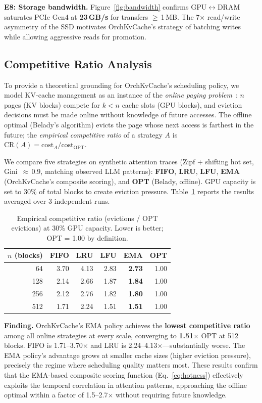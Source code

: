 \documentclass[conference]{IEEEtran}
\begin{document}
\textbf{E8: Storage bandwidth.} Figure~\ref{fig:bandwidth} confirms GPU$\leftrightarrow$DRAM saturates PCIe Gen4 at \textbf{23\,GB/s} for transfers $\geq$\,1\,MB. The 7$\times$ read/write asymmetry of the SSD motivates OrchKvCache's strategy of batching writes while allowing aggressive reads for promotion.

\subsection{Competitive Ratio Analysis}
\label{sec:competitive-ratio}

To provide a theoretical grounding for OrchKvCache's scheduling policy, we model KV-cache management as an instance of the \emph{online paging problem}~\cite{sleator-tarjan}: $n$ pages (KV blocks) compete for $k < n$ cache slots (GPU blocks), and eviction decisions must be made online without knowledge of future accesses. The offline optimal (Belady's algorithm) evicts the page whose next access is farthest in the future; the \emph{empirical competitive ratio} of a strategy $A$ is $\text{CR}(A) = \text{cost}_A / \text{cost}_{\text{OPT}}$.

We compare five strategies on synthetic attention traces (Zipf + shifting hot set, Gini~$\approx$\,0.9, matching observed LLM patterns): \textbf{FIFO}, \textbf{LRU}, \textbf{LFU}, \textbf{EMA} (OrchKvCache's composite scoring), and \textbf{OPT} (Belady, offline). GPU capacity is set to 30\% of total blocks to create eviction pressure. Table~\ref{tab:cr} reports the results averaged over 3 independent runs.

\begin{table}[t]
\centering
\caption{Empirical competitive ratio (evictions / OPT evictions) at 30\% GPU capacity. Lower is better; OPT = 1.00 by definition.}
\label{tab:cr}
\small
\begin{tabular}{@{}rrrrrr@{}}
\toprule
$n$ (blocks) & FIFO & LRU & LFU & \textbf{EMA} & OPT \\
\midrule
64  & 3.70 & 4.13 & 2.83 & \textbf{2.73} & 1.00 \\
128 & 2.14 & 2.66 & 1.87 & \textbf{1.84} & 1.00 \\
256 & 2.12 & 2.76 & 1.82 & \textbf{1.80} & 1.00 \\
512 & 1.71 & 2.24 & 1.51 & \textbf{1.51} & 1.00 \\
\bottomrule
\end{tabular}
\end{table}

\textbf{Finding.} OrchKvCache's EMA policy achieves the \textbf{lowest competitive ratio} among all online strategies at every scale, converging to \textbf{1.51$\times$} OPT at 512 blocks. FIFO is 1.71--3.70$\times$ and LRU is 2.24--4.13$\times$---substantially worse. The EMA policy's advantage grows at smaller cache sizes (higher eviction pressure), precisely the regime where scheduling quality matters most. These results confirm that the EMA-based composite scoring function (Eq.~\ref{eq:hotness}) effectively exploits the temporal correlation in attention patterns, approaching the offline optimal within a factor of 1.5--2.7$\times$ without requiring future knowledge.
\end{document}
